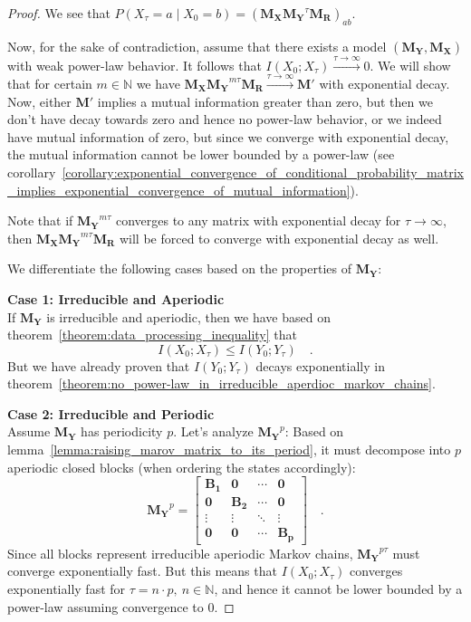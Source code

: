 \documentclass[../../main.tex]{subfiles}
\begin{document}
\begin{proof}
        We see that $P(X_{\tau} = a \mid X_0 = b) = (\bm{M_X} \bm{M_Y}^\tau \bm{M_R})_{ab}$.

        Now, for the sake of contradiction, assume that there exists a model $(\bm{M_Y}, \bm{M_X})$ with weak power-law behavior. It follows that $I(X_0; X_{\tau}) \xrightarrow{\tau \to \infty} 0$. We will show that for certain $m \in \mathbb{N}$ we have $\bm{M_X} \bm{M_Y}^{m \tau} \bm{M_R} \xrightarrow{\tau \to \infty} \bm{M'}$ with exponential decay. Now, either $\bm{M'}$ implies a mutual information greater than zero, but then we don't have decay towards zero and hence no power-law behavior, or we indeed have mutual information of zero, but since we converge with exponential decay, the mutual information cannot be lower bounded by a power-law (see corollary~\ref{corollary:exponential_convergence_of_conditional_probability_matrix_implies_exponential_convergence_of_mutual_information}).
        
        Note that if $\bm{M_Y}^{m \tau}$ converges to any matrix with exponential decay for $\tau \to \infty$, then $\bm{M_X} \bm{M_Y}^{m \tau} \bm{M_R}$ will be forced to converge with exponential decay as well.
        
        We differentiate the following cases based on the properties of $\bm{M_Y}$:

        \textbf{Case 1: Irreducible and Aperiodic} \\
        If $\bm{M_Y}$ is irreducible and aperiodic, then we have based on theorem~\ref{theorem:data_processing_inequality} that
        \[
            I(X_0; X_\tau) \leq I(Y_0; Y_\tau) \quad .
        \]
        But we have already proven that $I(Y_0; Y_\tau)$ decays exponentially in theorem~\ref{theorem:no_power-law_in_irreducible_aperdioc_markov_chains}.

        \textbf{Case 2: Irreducible and Periodic} \\
        Assume $\bm{M_Y}$ has periodicity $p$. Let's analyze $\bm{M_Y}^p$: Based on lemma~\ref{lemma:raising_marov_matrix_to_its_period}, it must decompose into $p$ aperiodic closed blocks (when ordering the states accordingly):
        \[
            \bm{M_Y}^p = 
            \begin{bmatrix}
            \bm{B_1} & \bm{0} & \cdots & \bm{0} \\
            \bm{0} & \bm{B_2} & \cdots & \bm{0} \\
            \vdots & \vdots & \ddots & \vdots \\
            \bm{0} & \bm{0} & \cdots & \bm{B_p}
            \end{bmatrix}
            \quad .
        \]
        Since all blocks represent irreducible aperiodic Markov chains, $\bm{M_Y}^{p \tau}$ must converge exponentially fast. But this means that $I(X_0; X_\tau)$ converges exponentially fast for $\tau = n \cdot p, \ n \in \mathbb{N}$, and hence it cannot be lower bounded by a power-law assuming convergence to $0$.


\end{proof}
\end{document}
